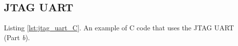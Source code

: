 \subsection*{JTAG UART}


\newpage


\newpage

\begin{center}
Listing \ref{lst:jtag_uart_C}. An example of C code that uses the JTAG UART (Part {\it b}).
\end{center}
\newpage

